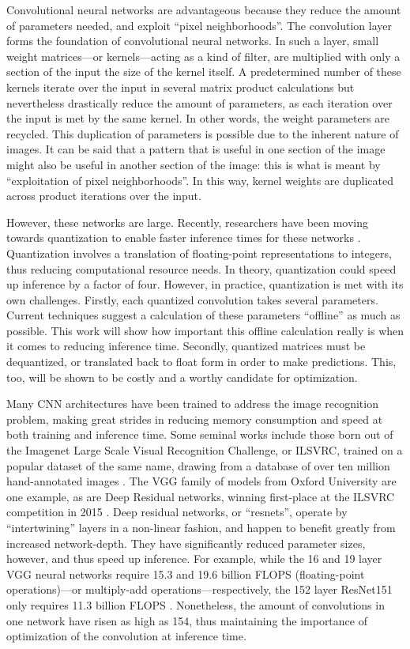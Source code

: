 Convolutional neural networks are advantageous because they reduce the amount of parameters needed, and exploit ``pixel neighborhoods''. The convolution layer forms the foundation of convolutional neural networks. In such a layer, small weight matrices---or kernels---acting as a kind of filter, are multiplied with only a section of the input the size of the kernel itself. A predetermined number of these kernels iterate over the input in several matrix product calculations but nevertheless drastically reduce the amount of parameters, as each iteration over the input is met by the same kernel. In other words, the weight parameters are recycled. This duplication of parameters is possible due to the inherent nature of images. It can be said that a pattern that is useful in one section of the image might also be useful in another section of the image: this is what is meant by ``exploitation of pixel neighborhoods''. In this way, kernel weights are duplicated across product iterations over the input.

However, these networks are large. Recently, researchers have been moving towards quantization to enable faster inference times for these networks \cite{warden_quantize}. Quantization involves a translation of floating-point representations to integers, thus reducing computational resource needs. In theory, quantization could speed up inference by a factor of four. However, in practice, quantization is met with its own challenges. Firstly, each quantized convolution takes several parameters. Current techniques suggest a calculation of these parameters ``offline'' as much as possible. This work will show how important this offline calculation really is when it comes to reducing inference time. Secondly, quantized matrices must be dequantized, or translated back to float form in order to make predictions. This, too, will be shown to be costly and a worthy candidate for optimization.

Many CNN architectures have been trained to address the image recognition problem, making great strides in reducing memory consumption and speed at both training and inference time. Some seminal works include those born out of the Imagenet Large Scale Visual Recognition Challenge, or ILSVRC, trained on a popular dataset of the same name, drawing from a database of over ten million hand-annotated images \cite{imagenet}. The VGG family of models from Oxford University \cite{return} are one example, as are Deep Residual networks, winning first-place at the ILSVRC competition in 2015 \cite{resnets2}. Deep residual networks, or ``resnets'', operate by ``intertwining'' layers in a non-linear fashion, and happen to benefit greatly from increased network-depth. They have significantly reduced parameter sizes, however, and thus speed up inference. For example, while the 16 and 19 layer VGG neural networks require 15.3 and 19.6 billion FLOPS (floating-point operations)---or multiply-add operations---respectively, the 152 layer ResNet151 only requires 11.3 billion FLOPS \cite{resnets2}. Nonetheless, the amount of convolutions in one network have risen as high as 154, thus maintaining the importance of optimization of the convolution at inference time. 


